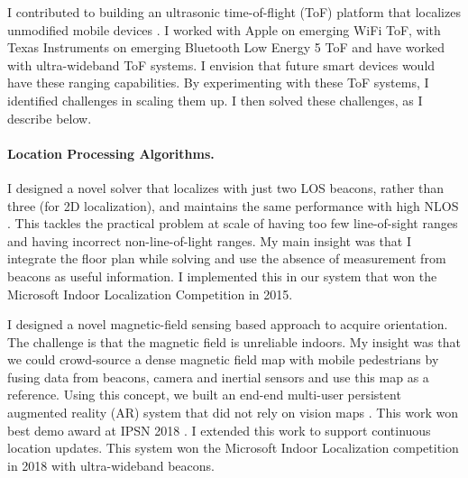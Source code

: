 \documentclass[10pt]{article}
\begin{document}
I contributed to building an ultrasonic time-of-flight (ToF) platform that localizes unmodified mobile devices \cite{rtas-alps-platform, lazik2015alps,lazik2015alpsdemo}. %
I worked with Apple on emerging WiFi ToF, with Texas Instruments on emerging Bluetooth Low Energy 5 ToF and have worked with ultra-wideband ToF systems. I envision that future smart devices would have these ranging capabilities. %
By experimenting with these ToF systems, I identified challenges in scaling them up. I then solved these challenges, as I describe below. %

\paragraph{Location Processing Algorithms.  } 
I designed a novel solver that localizes with just two LOS beacons, rather than three (for 2D localization), and maintains the same performance with high NLOS \cite{rajagopal2018enhancing}.  This tackles the practical problem at scale of having too few line-of-sight ranges and having incorrect non-line-of-light ranges. My main insight was that I integrate the floor plan while solving and use the absence of measurement from beacons as useful information. 
I implemented this in our system that won the Microsoft Indoor Localization Competition in 2015.

I designed a novel magnetic-field sensing based approach to acquire orientation. The challenge is that the magnetic field is unreliable indoors. My insight was that we could crowd-source a dense magnetic field map with mobile pedestrians by fusing data from beacons, camera and inertial sensors and use this map as a reference.  
Using this concept, we built an end-end multi-user persistent augmented reality (AR) system that did not rely on vision maps \cite{mobileAR}. 
This work won best demo award at IPSN 2018 \cite{rajagopal2018welcome}. 
I extended this work to support continuous location updates. This system won the Microsoft Indoor Localization competition in 2018 with ultra-wideband beacons.
\end{document}
